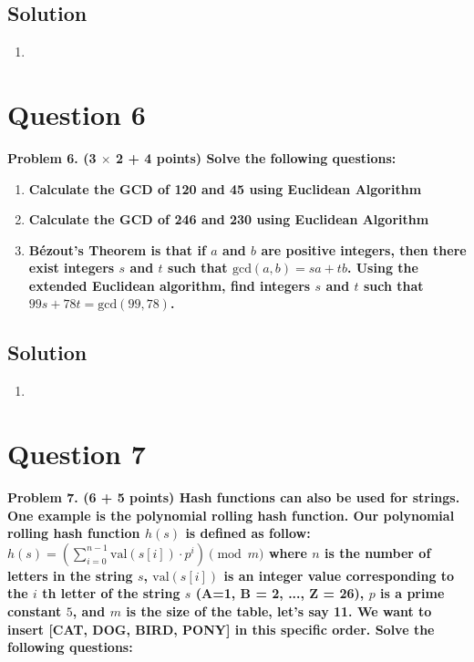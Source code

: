 \documentclass[11pt]{article}
\begin{document}
    \subsection*{Solution}
    \begin{enumerate}[label=(\alph*)]
        \item
    \end{enumerate}


\clearpage
\section*{Question 6}

    \textbf{Problem 6. (3 $\times$ 2 + 4 points) Solve the following questions:}
    \begin{enumerate}[label=(\alph*)]
        \item \textbf{Calculate the GCD of 120 and 45 using Euclidean Algorithm}
        \item \textbf{Calculate the GCD of 246 and 230 using Euclidean Algorithm}
        \item \textbf{Bézout’s Theorem is that if $a$ and $b$ are positive integers, then there exist integers $s$ and $t$ such that $\text{gcd}(a, b) = sa + tb$. Using the extended Euclidean algorithm, find integers $s$ and $t$ such that $99s + 78t = \text{gcd}(99, 78)$.}
    \end{enumerate}

    \subsection*{Solution}
    \begin{enumerate}[label=(\alph*)]
        \item 
    \end{enumerate}


\clearpage
\section*{Question 7}

    \textbf{Problem 7. (6 + 5 points) Hash functions can also be used for strings. One example is the polynomial rolling hash function. Our polynomial rolling hash function $h(s)$ is defined as follow:
    \( h(s) = \left( \sum_{i=0}^{n-1} \text{val}(s[i]) \cdot p^i \right) \pmod{m} \)
    where $n$ is the number of letters in the string $s$, \(\text{val}(s[i])\) is an integer value corresponding to the $i$ th letter of the string $s$ (A=1, B = 2, ..., Z = 26), $p$ is a prime constant $5$, and $m$ is the size of the table, let’s say 11. We want to insert [CAT, DOG, BIRD, PONY] in this specific order. Solve the following questions:}
\end{document}
